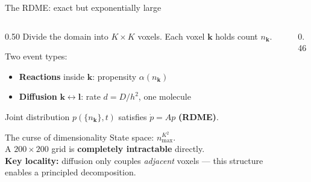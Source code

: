 \documentclass[10pt,aspectratio=169]{beamer}
\begin{document}
\begin{frame}{The RDME: exact but exponentially large}

  \begin{columns}[T]
    \begin{column}{0.50\textwidth}
      Divide the domain into $K{\times}K$ voxels.
      Each voxel $\mathbf{k}$ holds count $n_\mathbf{k}$.

      \medskip
      Two event types:
      \begin{itemize}\setlength\itemsep{0.35em}
        \item \textcolor{slowred}{\textbf{Reactions}} inside $\mathbf{k}$:
              propensity $\alpha(n_\mathbf{k})$
        \item \textcolor{fastblue}{\textbf{Diffusion}} $\mathbf{k}\leftrightarrow\mathbf{l}$:
              rate $d{=}D/h^2$, one molecule
      \end{itemize}

      \medskip
      Joint distribution $p(\{n_\mathbf{k}\},t)$ satisfies $\dot p = Ap$ \textbf{(RDME)}.

      \begin{alertblock}{The curse of dimensionality}
        State space: $n_{\max}^{K^2}$.\\
        A $200{\times}200$ grid is \textbf{completely intractable} directly.\\[0.3em]
        \textbf{Key locality:} diffusion only couples \emph{adjacent} voxels
        --- this structure enables a principled decomposition.
      \end{alertblock}
    \end{column}
    \begin{column}{0.46\textwidth}
      \begin{center}
      \end{center}
    \end{column}
  \end{columns}

\end{frame}
\end{document}
